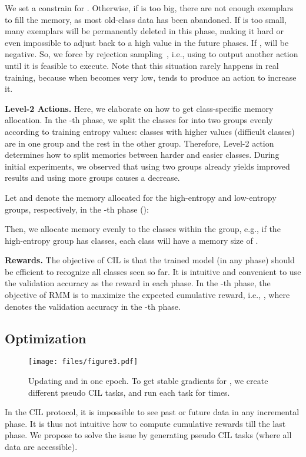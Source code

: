 \documentclass{article}
\newcommand{\myparagraph}[1]{\vspace{0.1em}\noindent\textbf{#1}}
\newcommand{\cotronlvsapce}{\vspace{0.0cm}}
\newcommand{\cotronlcaptionvsapce}{\vspace{0.0cm}}
\begin{document}
We set a constrain  for . Otherwise, if  is too big, there are not enough exemplars to fill the memory, as most old-class data has been abandoned. If  is too small, many exemplars will be permanently deleted in this phase, making it hard or even impossible to adjust  back to a high value in the future phases.
If ,  will be negative. So, we force  by rejection sampling~\cite{bishop2006pattern}, i.e., using  
to output another action until it is feasible to execute. Note that this situation rarely happens in real training, because when  becomes very low,  tends to produce an action to increase it.

\myparagraph{Level-2 Actions.} 
Here, we elaborate on how to get class-specific memory allocation. In the -th phase, we split the classes for  into two groups evenly according to training entropy values: classes with higher values (difficult classes) are in one group and the rest in the other group.
Therefore, Level-2 action  determines how to split memories between harder and easier classes. 
During initial experiments, we observed that using two groups already yields improved results and using more groups causes a decrease.

Let  and  denote the memory allocated for the high-entropy and low-entropy groups, respectively, in the -th phase (): 

Then, we allocate memory evenly to the classes within the group, e.g., if the high-entropy group has  classes, each class will have a memory size of .


\myparagraph{Rewards.} The objective of CIL is that the trained model (in any phase) should be efficient to recognize all classes seen so far.
It is intuitive and convenient to use the validation accuracy as the reward in each phase.
In the -th phase, the objective of RMM is to maximize the expected cumulative reward,
i.e., , 
where  denotes the validation accuracy in the -th phase.

\clearpage
\subsection{Optimization}
\label{subsec_optimization}

\begin{wrapfigure}{r}{0.47\textwidth}
\vspace{-0.5cm}
\centering
\texttt{[image: files/figure3.pdf]}
\cotronlcaptionvsapce
\vspace{0.1cm}
\caption{Updating  and  in one epoch. To get stable gradients for , we create  different pseudo CIL tasks, and run each task for  times.}
\label{fig_3}
\cotronlvsapce
\vspace{-0.3cm}
\end{wrapfigure} 
In the CIL protocol, it is impossible to see past or future data in any incremental phase. It is thus not intuitive how to compute cumulative rewards till the last phase.
We propose to solve the issue by generating pseudo CIL tasks (where all data are accessible).
\end{document}
